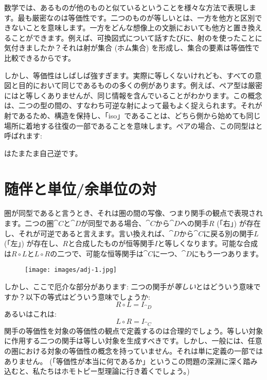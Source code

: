 
\lettrine[lhang=0.17]{数}{学}では、あるものが他のものと似ているということを様々な方法で表現します。最も厳密なのは等価性です。二つのものが等しいとは、一方を他方と区別できないことを意味します。一方をどんな想像上の文脈においても他方と置き換えることができます。例えば、可換図式について話すたびに、射のを使ったことに気付きましたか？それは射が集合 (ホム集合) を形成し、集合の要素は等価性で比較できるからです。

しかし、等価性はしばしば強すぎます。実際に等しくないけれども、すべての意図と目的において同じであるものの多くの例があります。例えば、ペア型は厳密にはと等しくありませんが、同じ情報を含んでいることがわかります。この概念は、二つの型の間の、すなわち可逆な射によって最もよく捉えられます。それが射であるため、構造を保持し、「iso」であることは、どちら側から始めても同じ場所に着地する往復の一部であることを意味します。ペアの場合、この同型はと呼ばれます: 

はたまたま自己逆です。

\section{随伴と単位/余単位の対}

圏が同型であると言うとき、それは圏の間の写像、つまり関手の観点で表現されます。二つの圏$\cat{C}$と$\cat{D}$が同型である場合、$\cat{C}$から$\cat{D}$への関手$R$ (「右」) が存在し、それが可逆であると言えます。言い換えれば、$\cat{D}$から$\cat{C}$に戻る別の関手$L$ (「左」) が存在し、$R$と合成したものが恒等関手$I$と等しくなります。可能な合成は$R \circ L$と$L \circ R$の二つで、可能な恒等関手は$\cat{C}$に一つ、$\cat{D}$にもう一つあります。

\begin{figure}[H]
  \centering
  \texttt{[image: images/adj-1.jpg]}
\end{figure}

\noindent
しかし、ここで厄介な部分があります: 二つの関手が\emph{等しい}とはどういう意味ですか？以下の等式はどういう意味でしょうか: 
\[R \circ L = I_{\cat{D}}\]
あるいはこれは: 
\[L \circ R = I_{\cat{C}}\]
関手の等価性を対象の等価性の観点で定義するのは合理的でしょう。等しい対象に作用する二つの関手は等しい対象を生成すべきです。しかし、一般には、任意の圏における対象の等価性の概念を持っていません。それは単に定義の一部ではありません。 (「等価性が本当に何であるか」というこの問題の深淵に深く踏み込むと、私たちはホモトピー型理論に行き着くでしょう。) 

